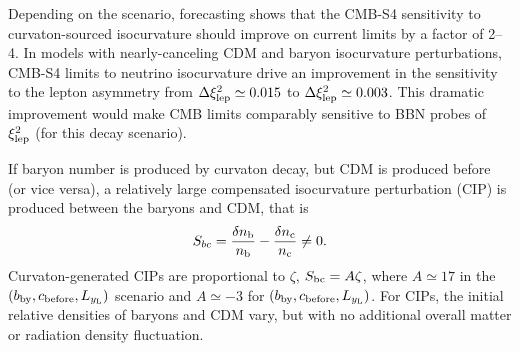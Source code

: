 Depending on the scenario, forecasting shows that the CMB-S4 sensitivity to curvaton-sourced isocurvature should improve on current limits by a factor of 2--4. In models with nearly-canceling CDM and baryon isocurvature perturbations, CMB-S4 limits to neutrino isocurvature drive an improvement in the sensitivity to the lepton asymmetry from $\Delta \xi_{\rm lep}^{2}\simeq 0.015$ to $\Delta \xi_{\rm lep}^{2}\simeq 0.003$. This dramatic improvement would make CMB limits comparably sensitive to BBN probes of $\xi_{\rm lep}^{2}$ (for this decay scenario).

If baryon number is produced by curvaton decay, but CDM is produced before (or vice versa), a relatively large compensated isocurvature perturbation (CIP) is produced between the baryons and CDM, that is
\begin{equation}
S_{bc}=\frac{\delta n_{\rm b}}{n_{\rm b}}-\frac{\delta n_{\rm c}}{n_{\rm c}}\neq 0.
\end{equation} 
Curvaton-generated CIPs are proportional to $\zeta$, $S_{\rm bc}=A\zeta$, where $A\simeq 17$ in the $(b_{\rm by}, c_{\rm before}, L_{ y_{\rm L}})$ scenario and $A\simeq -3$ for $(b_{\rm by}, c_{\rm before}, L_{ y_{\rm L}})$. For CIPs, the initial relative densities of baryons and CDM vary, but with no additional overall matter or radiation density fluctuation.


